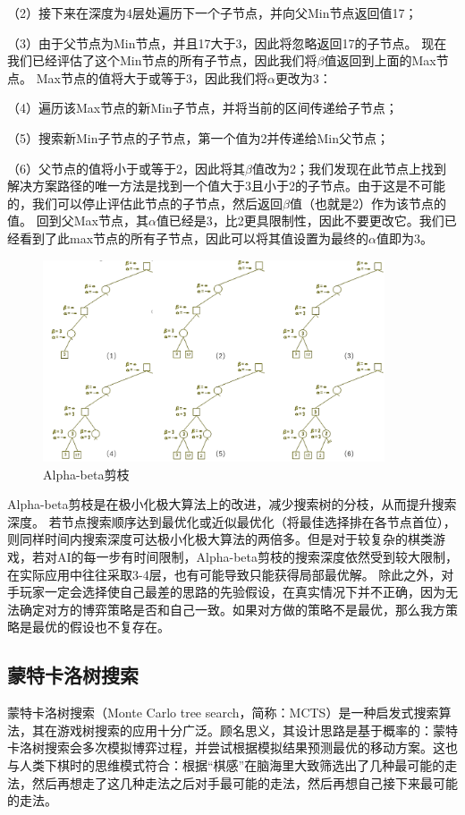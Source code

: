 （2）接下来在深度为4层处遍历下一个子节点，并向父Min节点返回值17；

（3）由于父节点为Min节点，并且17大于3，因此将忽略返回17的子节点。 现在我们已经评估了这个Min节点的所有子节点，因此我们将$\beta$值返回到上面的Max节点。 Max节点的值将大于或等于3，因此我们将$\alpha$更改为3：

（4）遍历该Max节点的新Min子节点，并将当前的区间传递给子节点；

（5）搜索新Min子节点的子节点，第一个值为2并传递给Min父节点；

（6）父节点的值将小于或等于2，因此将其$\beta$值改为2；我们发现在此节点上找到解决方案路径的唯一方法是找到一个值大于3且小于2的子节点。由于这是不可能的，我们可以停止评估此节点的子节点，然后返回$\beta$值（也就是2）作为该节点的值。
回到父Max节点，其$\alpha$值已经是3，比2更具限制性，因此不要更改它。我们已经看到了此max节点的所有子节点，因此可以将其值设置为最终的$\alpha$值即为3。

\begin{figure}[htb]
    \centering
    \includegraphics[width=0.9\textwidth]{abp2.PNG}
    \caption[abp2]{%
    Alpha-beta剪枝\cite{russell2010artificial}%
      }
    \label{fig:abp2}
  \end{figure}
\newpage
Alpha-beta剪枝是在极小化极大算法上的改进，减少搜索树的分枝，从而提升搜索深度。
若节点搜索顺序达到最优化或近似最优化（将最佳选择排在各节点首位），则同样时间内搜索深度可达极小化极大算法的两倍多\cite{KNUTH1975293abp}。但是对于较复杂的棋类游戏，若对AI的每一步有时间限制，Alpha-beta剪枝的搜索深度依然受到较大限制，在实际应用中往往采取3-4层，也有可能导致只能获得局部最优解。
除此之外，对手玩家一定会选择使自己最差的思路的先验假设，在真实情况下并不正确，因为无法确定对方的博弈策略是否和自己一致。如果对方做的策略不是最优，那么我方策略是最优的假设也不复存在。

\subsection{蒙特卡洛树搜索}
蒙特卡洛树搜索（Monte Carlo tree search，简称：MCTS）是一种启发式搜索算法，其在游戏树搜索的应用十分广泛\cite{10.1007/978-3-540-75538-8_7}。顾名思义，其设计思路是基于概率的：蒙特卡洛树搜索会多次模拟博弈过程，并尝试根据模拟结果预测最优的移动方案。这也与人类下棋时的思维模式符合：根据“棋感”在脑海里大致筛选出了几种最可能的走法，然后再想走了这几种走法之后对手最可能的走法，然后再想自己接下来最可能的走法。

